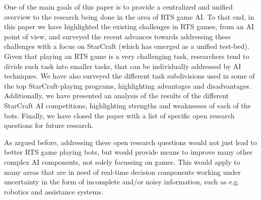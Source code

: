 \documentclass[journal]{IEEEtran}
\begin{document}
One of the main goals of this paper is to provide a centralized and unified overview to the research being done in the area of RTS game AI. To that end, in this paper we have  highlighted the existing challenges in RTS games, from an AI point of view, and surveyed the recent advances towards addressing these challenges with a focus on StarCraft (which has emerged as a unified test-bed). Given that playing an RTS game is a very challenging task, researchers tend to divide such task into smaller tasks, that can be individually addressed by AI techniques. We have also surveyed the different task subdivisions used in some of the top StarCraft-playing programs, highlighting advantages and disadvantages. Additionally, we have presented an analysis of the results of the different StarCraft AI competitions, highlighting strengths and weaknesses of each of the bots. Finally, we have closed the paper with a list of specific open research questions for future research.

As argued before, addressing these open research questions would not just lead to better RTS game playing bots, but would provide means to improve many other complex AI components, not solely focussing on games. This would apply to many areas that are in need of real-time decision components working under uncertainty in the form of incomplete and/or noisy information, such as  e.g. robotics and assistance systems.







\ifCLASSOPTIONcaptionsoff
  \newpage
\fi

                                                    


\end{document}
